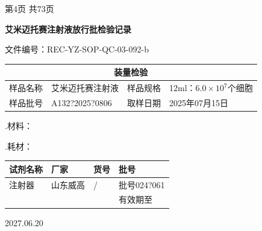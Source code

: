\documentclass[UTF8,10pt,a4paper,fontset=fandol]{ctexart}
\newcommand{\fieldvalue}[1]{#1}
\newcommand{\handwritten}[1]{#1}
\begin{document}
\begin{center}
第4页 共73页
\end{center}

\newpage

\begin{center}
\textbf{艾米迈托赛注射液放行批检验记录}
\end{center}

\noindent 文件编号：REC-YZ-SOP-QC-03-092-b

\begin{center}
\begin{tabular}{|p{2.2cm}|p{5.0cm}|p{2.2cm}|p{5.0cm}|}
\hline
\multicolumn{4}{|c|}{\textbf{装量检验}}\\
\hline
样品名称 &
\fieldvalue{艾米迈托赛注射液} &
样品规格 &
\fieldvalue{12ml：$6.0\times 10^{7}$个细胞}\\
\hline
样品批号 &
\fieldvalue{\handwritten{A132?2025?0806}} &
取样日期 &
\fieldvalue{\handwritten{2025年07月15日}}\\
\hline
\end{tabular}
\end{center}

.\quad 材料：

.\quad 耗材：

\begin{center}
\begin{tabular}{|p{3.5cm}|p{3.2cm}|p{3.2cm}|p{3.2cm}|}
\hline
\textbf{试剂名称} & \textbf{厂家} & \textbf{货号} & \textbf{批号} \\
\hline
注射器 &
\fieldvalue{\handwritten{山东威高}} &
\fieldvalue{\handwritten{/}} &
\fieldvalue{\handwritten{批号024?061}} \\
\hline
\multicolumn{3}{|c|}{} & 有效期至 \\
\hline
\end{tabular}
\end{center}

\noindent\hspace{8.5cm}%
\fieldvalue{\handwritten{2027.06.20}}
\end{document}
